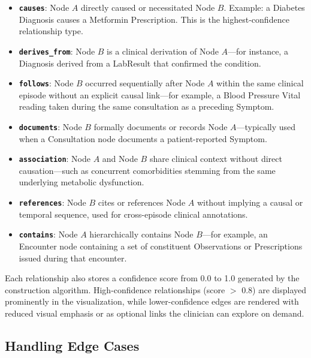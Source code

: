 \begin{itemize}
    \item \textbf{\texttt{causes}}: Node $A$ directly caused or necessitated
    Node $B$. Example: a Diabetes Diagnosis causes a Metformin Prescription.
    This is the highest-confidence relationship type.

    \item \textbf{\texttt{derives\_from}}: Node $B$ is a clinical derivation of
    Node $A$---for instance, a Diagnosis derived from a LabResult that confirmed
    the condition.

    \item \textbf{\texttt{follows}}: Node $B$ occurred sequentially after Node
    $A$ within the same clinical episode without an explicit causal link---for
    example, a Blood Pressure Vital reading taken during the same consultation as
    a preceding Symptom.

    \item \textbf{\texttt{documents}}: Node $B$ formally documents or records
    Node $A$---typically used when a Consultation node documents a
    patient-reported Symptom.

    \item \textbf{\texttt{association}}: Node $A$ and Node $B$ share clinical
    context without direct causation---such as concurrent comorbidities stemming
    from the same underlying metabolic dysfunction.

    \item \textbf{\texttt{references}}: Node $B$ cites or references Node $A$
    without implying a causal or temporal sequence, used for cross-episode
    clinical annotations.

    \item \textbf{\texttt{contains}}: Node $A$ hierarchically contains Node
    $B$---for example, an Encounter node containing a set of constituent
    Observations or Prescriptions issued during that encounter.
\end{itemize}

Each relationship also stores a confidence score from 0.0 to 1.0 generated by
the construction algorithm. High-confidence relationships (score $>$ 0.8) are
displayed prominently in the visualization, while lower-confidence edges are
rendered with reduced visual emphasis or as optional links the clinician can
explore on demand.

\subsection{Handling Edge Cases}
\label{subsec:edge_cases}

